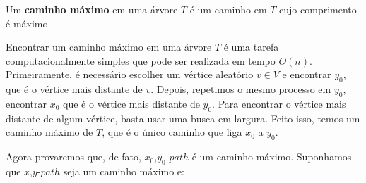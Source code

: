 \documentclass[a4paper,12pt]{article}
\begin{document}
    	

    	Um \textbf{caminho máximo} em uma árvore $T$ é
    	um caminho em $T$ cujo comprimento é máximo.

    	Encontrar um caminho máximo em uma árvore $T$ é uma tarefa
    	computacionalmente simples que pode ser realizada em tempo 
    	$O(n)$. 
    	Primeiramente, é necessário escolher um vértice aleatório 
    	$v \in V$ e encontrar $y_0$,
    	que é o vértice mais distante de $v$.
    	Depois, repetimos o mesmo processo em $y_0$, encontrar
    	$x_0$ que é o vértice mais distante de $y_0$. 
    	Para encontrar o vértice mais distante de algum vértice, 
    	basta usar uma busca em largura.  
    	Feito isso, temos um caminho máximo de $T$, que é o único
    	caminho que liga $x_0$ a $y_0$.


    	Agora provaremos que, de fato, $x_0$,$y_0$-$path$ é um
    	caminho máximo.
    	Suponhamos que $x$,$y$-$path$ seja um caminho máximo e:
\end{document}
